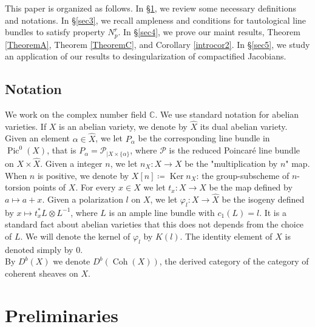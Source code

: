 \documentclass[11pt,letter]{amsart}
\newcommand\sti[1]{\todo[inline,color=magenta]{#1}}%
\newcommand\mji[1]{\todo[inline,color=yellow]{#1}}%
\numberwithin{equation}{section}
\begin{document}
  
  
  
  
  This paper is organized as follows. In \S\ref{sec2}, we review some necessary definitions and notations. In \S\ref{sec3}, we recall ampleness and conditions for tautological line bundles to satisfy property $N_p^r$. In \S\ref{sec4}, we prove our maint results, Theorem \ref{TheoremA}, Theorem \ref{TheoremC}, and Corollary \ref{introcor2}. In \S\ref{sec5}, we study an application of our results to desingularization of compactified Jacobians.
\subsection*{Notation}
We work on the complex number field $\mathbb{C}$. We use standard notation for abelian varieties. If $X$ is an abelian variety, we denote by $\hat{X}$ its dual abelian variety. Given an element $\alpha\in\hat{X}$, we let $P_\alpha$ be the corresponding line bundle in $\operatorname{Pic}^0(X)$, that is 
$P_\alpha=\mathscr{P}_{|X\times\{\alpha\}}$, where $\mathscr{P}$ is the reduced Poincar\'e line bundle on $X\times \hat X$. Given a integer $n$, we let $n_X:X\rightarrow X$ be the "multiplication by $n$" map. When $n$ is positive, we denote by $X[n]\coloneqq \operatorname{Ker}n_X$: the group-subscheme of $n$-torsion points of $X$. For every $x\in X$ we let $t_x:X\rightarrow X$ be the map defined by $a\mapsto a+x$. Given a polarization $l$ on $X$, we let $\varphi_l:X\rightarrow \hat{X}$ be the isogeny defined by $x\mapsto t_x^*L\otimes L^{-1}$, where $L$ is an ample line bundle with $c_1(L)=l$. It is a standard fact about abelian varieties that this does not depends from the choice of $L$. We will denote the  kernel of $\varphi_l$ by $K(l)$. The identity element of $X$ is denoted simply by 0.\\ By $D^b(X)$ we denote $D^b(\operatorname{Coh}(X))$, the derived category of the category of coherent sheaves on $X$.

\section{Preliminaries}\label{sec2}
\end{document}
